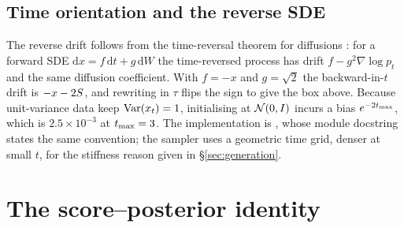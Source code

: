 \subsection{Time orientation and the reverse SDE}

\begin{center}
\end{center}

The reverse drift follows from the time-reversal theorem for diffusions
\citep{anderson1982,haussmann1986}: for a forward SDE $\mathrm{d}x = f\,\mathrm{d}t +
g\,\mathrm{d}W$ the time-reversed process has drift $f - g^2\nabla\log p_t$ and the same
diffusion coefficient. With $f=-x$ and $g=\sqrt{2}$ the backward-in-$t$ drift is
$-x - 2S$, and rewriting in $\tau$ flips the sign to give the box above. Because unit-variance
data keep $\operatorname{Var}(x_t)=1$, initialising at $\mathcal{N}\!\left(0,I\right)$ incurs a bias $e^{-2t_{\max}}$, which is
$2.5\times10^{-3}$ at $t_{\max}=3$. The implementation is
, whose module docstring states the same convention; the sampler uses a
geometric time grid, denser at small $t$, for the stiffness reason given in
\S\ref{sec:generation}.

\section{The score--posterior identity}
\label{app:identity}

